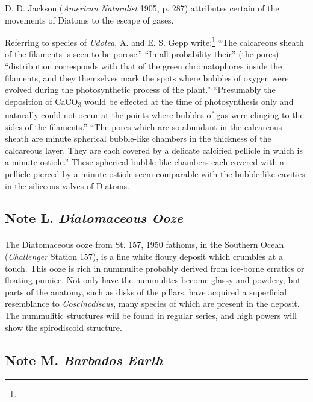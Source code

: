 \documentclass[a4paper, 12pt, oneside]{article}
\begin{document}
D. D. Jackson (\emph{American Naturalist} 1905, p. 287) attributes certain of the movements of Diatoms to the escape of gases.

Referring to species of \emph{Udotea}, A. and E. S. Gepp write:\footnote{} ``The calcareous sheath of the filaments is seen to be porose.'' ``In all probability their'' (the pores) ``distribution corresponds with that of the green chromatophores inside the filaments, and they themselves mark the spots where bubbles of oxygen were evolved during the photosynthetic process of the plant.'' ``Presumably the deposition of CaCO\textsubscript{3} would be effected at the time of photosynthesis only and naturally could not occur at the points where bubbles of gas were clinging to the sides of the filaments.'' ``The pores which are so abundant in the calcareous sheath are minute spherical bubble-like chambers in the thickness of the calcareous layer. They are each covered by a delicate calcified pellicle in which is a minute ostiole.'' These spherical bubble-like chambers each covered with a pellicle pierced by a minute ostiole seem comparable with the bubble-like cavities in the siliceous valves of Diatoms.

\subsection{Note L. \emph{Diatomaceous Ooze}}
\paragraph{}
The Diatomaceous ooze from St. 157, 1950 fathoms, in the Southern Ocean (\emph{Challenger} Station 157), is a fine white floury deposit which crumbles at a touch. This ooze is rich in nummulite probably derived from ice-borne erratics or floating pumice. Not only have the nummulites become glassy and powdery, but parts of the anatomy, such as disks of the pillars, have acquired a superficial resemblance to \emph{Coscinodiscus}, many species of which are present in the deposit. The nummulitic structures will be found in regular series, and high powers will show the spirodiscoid structure.

\subsection{Note M. \emph{Barbados Earth}}
\end{document}
